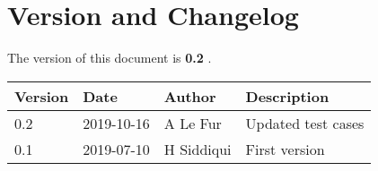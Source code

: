 \section{Version and Changelog}

The version of this document is {\bf 0.2} .

\begin{table}[H]
    \begin{tabular}{|l|l|l|p{10cm}| }
    \hline
    {\bf Version} & {\bf Date} & {\bf Author} & {\bf Description} \\ \hline
    0.2 & 2019-10-16 & A Le Fur & Updated test cases \\ \hline
    0.1 & 2019-07-10 & H Siddiqui & First version \\ \hline
    \end{tabular}
\end{table}

